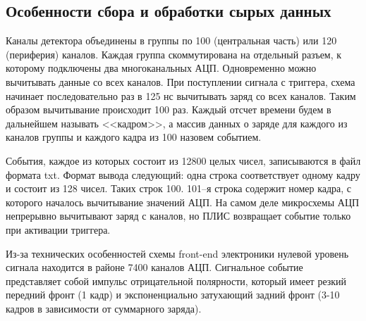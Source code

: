\subsection{Особенности сбора и обработки сырых данных}
Каналы детектора объединены в группы по 100 (центральная часть) или 120 (периферия) каналов. Каждая группа скоммутирована на отдельный разъем, к которому подключены два многоканальных АЦП. Одновременно можно вычитывать данные со всех каналов. При поступлении сигнала с триггера, схема начинает последовательно раз в 125 нс вычитывать заряд со всех каналов. Таким образом вычитывание происходит 100 раз. Каждый отсчет времени будем в дальнейшем называть <<кадром>>, а массив данных о заряде для каждого из каналов группы и каждого кадра из 100 назовем событием. 
\par События, каждое из которых состоит из 12800 целых чисел, записываются в файл формата txt. Формат вывода следующий: одна строка соответствует одному кадру и состоит из 128 чисел. Таких строк 100. 101--я строка содержит номер кадра, с которого началось вычитывание значений АЦП. На самом деле микросхемы АЦП непрерывно вычитывают заряд с каналов, но ПЛИС возвращает событие только при активации триггера. 
\par Из-за технических особенностей схемы front-end электроники нулевой уровень сигнала находится в районе 7400 каналов АЦП. Сигнальное событие представляет собой импульс отрицательной полярности, который имеет резкий передний фронт (1 кадр) и экспоненциально затухающий задний фронт (3-10 кадров в зависимости от суммарного заряда).